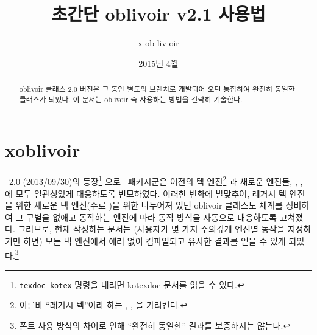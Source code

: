 \documentclass[
	12pt,
	a4paper,
	kosection,
	footnote,
	nobookmarks,
	microtype,
]{oblivoir}
\newcommand\xobclass{x\-ob\-liv\-oir\oblivoirallowbreak}
\newcommand\obclass{ob\-liv\-oir\oblivoirallowbreak}
\begin{document}
\title{초간단 \obclass{} v2.1 사용법}

\date{2015년 4월}

\author{x-ob-liv-oir }

\maketitle

\begin{abstract}
\obclass{} 클래스 2.0 버전은 그 동안 별도의 브랜치로 개발되어 오던
  통합하여 완전히 동일한 클래스가 되었다.
이 문서는 \obclass{} 즉 
사용하는 방법을 간략히 기술한다.
\end{abstract}

\tableofcontents*

\clearpage

\section{ \xobclass{}}


\koTeX\ 2.0 (2013/09/30)의 등장\footnote{%
	\texttt{texdoc kotex} 명령을 내리면 kotexdoc 문서를 읽을 수 있다.}%
으로 \koTeX\ 패키지군은 이전의 텍 엔진\footnote{%
	이른바 ``레거시 텍''이라 하는 , , 을
	가리킨다.}%
과 새로운 엔진들, , ,
에 모두 일관성있게 대응하도록 변모하였다.
이러한 변화에 발맞추어, 레거시 텍 엔진을 위한  새로운 텍 엔진(주로 )을 위한 
나누어져 있던 oblivoir 클래스도 체계를 정비하여 그 구별을 없애고 동작하는 엔진에 따라 동작 방식을
자동으로 대응하도록 고쳐졌다. 그러므로, 현재  작성하는 문서는 
(사용자가 몇 가지 주의깊게 엔진별 동작을 지정하기만 하면) 모든 텍 엔진에서 에러 없이 컴파일되고
유사한 결과를 얻을 수 있게 되었다.\footnote{%
	폰트 사용 방식의 차이로 인해 ``완전히 동일한'' 결과를 보증하지는 않는다.}
\end{document}
